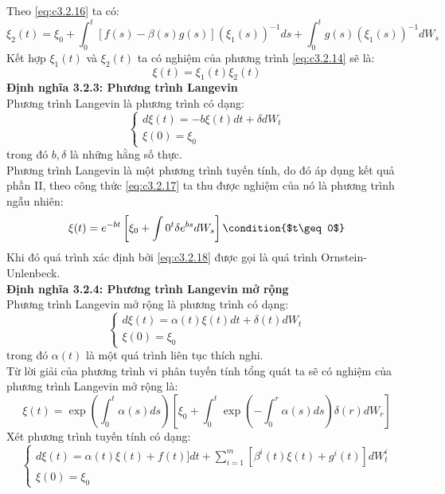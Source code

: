 \documentclass[12pt,a4paper]{article}
\begin{document}
Theo \eqref{eq:c3.2.16} ta có:
\begin{equation*}
	\xi_2(t)=\xi_0+\int_{0}^{t}[f(s)-\beta(s)g(s)](\xi_1(s))^{-1}ds+\int_{0}^{t}g(s)(\xi_1(s))^{-1}dW_s
\end{equation*}
Kết hợp $\xi_1(t)$ và $\xi_2(t)$ ta có nghiệm của phương trình \eqref{eq:c3.2.14} sẽ là:
\begin{equation*}
	\xi(t)=\xi_1(t)\xi_2(t)
\end{equation*}
\textbf{Định nghĩa 3.2.3: Phương trình Langevin}\\
Phương trình Langevin là phương trình có dạng:
\begin{equation}\label{eq:c3.2.17}
	\begin{cases}
		d\xi(t)=-b\xi(t)dt+\delta dW_t\\
		\xi(0)=\xi_0
	\end{cases}
\end{equation}
trong đó $b,\delta$ là những hằng số thực.\\
Phương trình Langevin là một phương trình tuyến tính, do đó áp dụng kết quả phần II, theo công thức \eqref{eq:c3.2.17} ta thu được nghiệm của nó là phương trình ngẫu nhiên:
\begin{equation}\label{eq:c3.2.18}
	\xi(t)=e^{-bt}\left[\xi_0+\int{0}^{t}\delta e^{bs}dW_s \right] \condition{$t\geq 0$}
\end{equation}
Khi đó quá trình xác định bởi \eqref{eq:c3.2.18} được gọi là quá trình Ornstein-Unlenbeck.\\
\textbf{Định nghĩa 3.2.4: Phương trình Langevin mở rộng}\\
Phương trình Langevin mở rộng là phương trình có dạng:
\begin{equation}\label{eq:c3.2.19}
	\begin{cases}
		d\xi(t)=\alpha(t)\xi(t)dt+\delta(t)dW_t\\
		\xi(0)=\xi_0
	\end{cases}
\end{equation}
trong đó $\alpha(t)$ là một quá trình liên tục thích nghi.\\
Từ lời giải của phương trình vi phân tuyến tính tổng quát ta sẽ có nghiệm của phương trình Langevin mở rộng là:
\begin{equation}\label{eq:c3.2.20}
	\xi(t)=\exp\left(\int_{0}^{t}\alpha(s)ds\right)\left[\xi_0+\int_{0}^{t}\exp\left(-\int_{0}^{r}\alpha(s)ds \right)\delta(r)dW_r \right]
\end{equation}
Xét phương trình tuyến tính có dạng:
\begin{equation}\label{eq:c3.2.21}
	\begin{cases}
		d\xi(t)=\alpha(t)\xi(t)+f(t)]dt+\sum\limits_{i=1}^{m}\left[\beta^i(t)\xi(t)+g^i(t)\right]dW_t^i\\
		\xi(0)=\xi_0
	\end{cases}
\end{equation}
\end{document}
